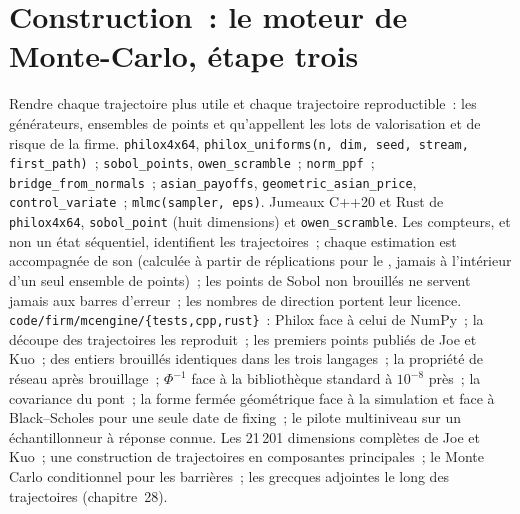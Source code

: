\section{Construction~: le moteur de Monte-Carlo, étape trois}\label{bld:qm:monte-carlo:mcengine}

\begin{build}
 Rendre chaque trajectoire plus utile et chaque trajectoire reproductible~: les générateurs, ensembles de points et  qu'appellent les lots de valorisation et de risque de la firme.
 \texttt{philox4x64}, \texttt{philox\_uniforms(n, dim, seed, stream, first\_path)}~; \texttt{sobol\_points}, \texttt{owen\_scramble}~; \texttt{norm\_ppf}~;
\texttt{bridge\_from\_normals}~; \texttt{asian\_payoffs}, \texttt{geometric\_asian\_price}, \texttt{control\_variate}~; \texttt{mlmc(sampler, eps)}. Jumeaux C++20 et Rust de \texttt{philox4x64},
\texttt{sobol\_point} (huit dimensions) et \texttt{owen\_scramble}.
 Les compteurs, et non un état séquentiel, identifient les trajectoires~; chaque estimation est accompagnée de son  (calculée à partir de réplications pour le , jamais à l'intérieur d'un seul ensemble de points)~;
les points de Sobol non brouillés ne servent jamais aux barres d'erreur~; les nombres de direction portent leur licence.
 \texttt{code/firm/mcengine/\{tests,cpp,rust\}}~: Philox face à celui de NumPy~; la découpe des trajectoires les reproduit~; les premiers points publiés de Joe et Kuo~; des entiers brouillés identiques dans
les trois langages~; la propriété de réseau après brouillage~; $\Phi^{-1}$ face à la bibliothèque standard à $10^{-8}$ près~; la covariance du pont~; la forme fermée géométrique face à la simulation et face à
Black--Scholes pour une seule date de fixing~; le pilote multiniveau sur un échantillonneur à réponse connue.
 Les 21\,201 dimensions complètes de Joe et Kuo~; une construction de trajectoires en composantes principales~; le Monte Carlo conditionnel pour les barrières~; les grecques adjointes le long des trajectoires (chapitre~28).
\end{build}

